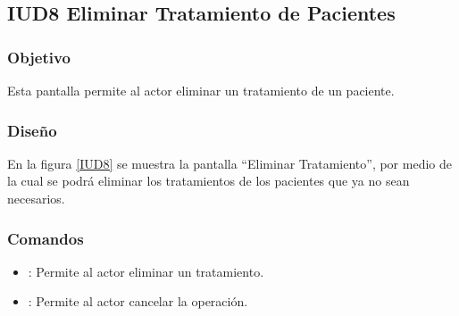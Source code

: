 \subsection{IUD8 Eliminar Tratamiento de Pacientes}
 
\subsubsection{Objetivo}

    Esta pantalla permite al actor eliminar un tratamiento de un paciente.

\subsubsection{Diseño}

    En la figura \ref{IUD8} se muestra la pantalla ``Eliminar Tratamiento'', por medio de la cual se podrá eliminar los tratamientos de los pacientes que ya no sean necesarios. \\


\subsubsection{Comandos}
\begin{itemize}
    \item {}: Permite al actor eliminar un tratamiento.
    \item {}: Permite al actor cancelar la operación.
    
\end{itemize}

%
